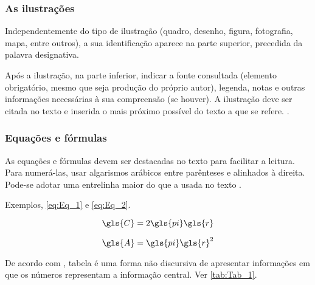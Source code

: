 \subsubsection{As ilustrações}

Independentemente do tipo de ilustração (quadro, desenho, figura, fotografia, mapa, entre outros), a sua identificação aparece na parte superior, precedida da palavra designativa.

\begin{citacao}
	Após a ilustração, na parte inferior, indicar a fonte consultada (elemento obrigatório, mesmo que seja produção do próprio autor), legenda, notas e outras informações necessárias à sua compreensão (se houver). A ilustração deve ser citada no texto e inserida o mais próximo possível do texto a que se refere. \cite[p. 11]{NBR14724:2011}.
\end{citacao}

\subsubsection{Equações e fórmulas}

As equações e fórmulas devem ser destacadas no texto para facilitar a leitura.  Para numerá-las, usar algarismos arábicos entre parênteses e alinhados à direita. Pode-se adotar uma entrelinha maior do que a usada no texto \cite{NBR14724:2011}.

Exemplos, \autoref{eq:Eq_1} e \autoref{eq:Eq_2}.

\begin{equation}\label{eq:Eq_1}
\gls{C} = 2 \gls{pi} \gls{r}
\end{equation}

\begin{equation}\label{eq:Eq_2}
\gls{A} = \gls{pi} \gls{r}^2
\end{equation}


De acordo com \textcite{ibge1993}, tabela é uma forma não discursiva de apresentar informações em que os números representam a informação central. Ver \autoref{tab:Tab_1}.


